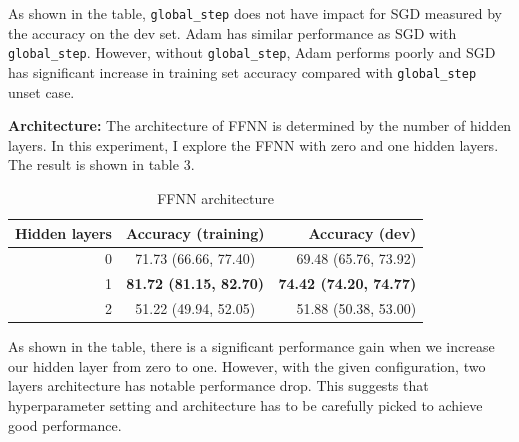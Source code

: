 \documentclass[11pt,a4paper]{article}
\begin{document}
As shown in the table, \verb|global_step| does not have impact for SGD
measured by the accuracy on the dev set. Adam has similar performance
as SGD with \verb|global_step|. However, without \verb|global_step|,
Adam performs poorly and SGD has significant increase in training set
accuracy compared with \verb|global_step| unset case.

\textbf{Architecture:} The architecture of FFNN is determined by the number of 
hidden layers. In this experiment, I explore the FFNN with zero and one
hidden layers. The result is shown in table 3. 

\begin{table}[!htb]
\captionsetup{size=footnotesize}
\caption{FFNN architecture} \label{tab:freq}
\setlength\tabcolsep{0pt} %
\footnotesize\centering

\smallskip 
\begin{tabular*}{\columnwidth}{@{\extracolsep{\fill}}rcr}
\toprule
  Hidden layers  &  Accuracy (training) & Accuracy (dev) \\
\midrule
 0   &  71.73 (66.66, 77.40)   &  69.48 (65.76, 73.92)     \\
 1    & \textbf{81.72 (81.15, 82.70)}    & \textbf{74.42 (74.20, 74.77)}     \\
 2   & 51.22 (49.94, 52.05)     & 51.88 (50.38, 53.00)     \\
\bottomrule
\end{tabular*}
\end{table}

As shown in the table, there is a significant performance gain 
when we increase our hidden layer from zero to one. However, with
the given configuration, two layers architecture has notable performance
drop. This suggests that hyperparameter setting and architecture has
to be carefully picked to achieve good performance.
\end{document}
